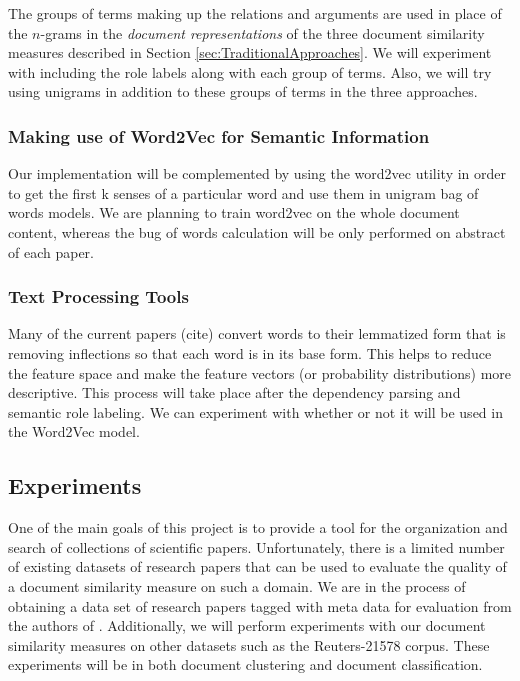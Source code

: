 \documentclass[11pt]{article}
\begin{document}
The groups of terms making up the relations and arguments are used in place of the $n$-grams in the \emph{document representations} of the three document similarity measures described in Section \ref{sec:TraditionalApproaches}. We will experiment with including the role labels along with each group of terms. Also, we will try using unigrams in addition to these groups of terms in the three approaches. 


\subsubsection{Making use of Word2Vec for Semantic Information} \label{sec:Word2Vec}


Our implementation will be complemented by using the word2vec utility in order to get the first k senses of a particular word and use them in unigram bag of words models. We are planning to train word2vec on the whole document content, whereas the bug of words calculation will be only performed on abstract of each paper. 

\subsubsection{Text Processing Tools}

Many of the current papers (cite) convert words to their lemmatized form that is removing inflections so that each word is in its base form. This helps to reduce the feature space and make the feature vectors (or probability distributions) more descriptive. This process will take place after the dependency parsing and semantic role labeling. We can experiment with whether or not it will be used in the Word2Vec model. 

\subsection{Experiments}

One of the main goals of this project is to provide a tool for the organization and search of collections of scientific papers. Unfortunately, there is a limited number of existing datasets of research papers that can be used to evaluate the quality of a document similarity measure on such a domain. We are in the process of obtaining a data set of research papers tagged with meta data for evaluation from the authors of \cite{Hurtado2013}. Additionally, we will perform experiments with our document similarity measures on other datasets such as the Reuters-21578 corpus. These experiments will be in both document clustering and document classification. 
\end{document}
